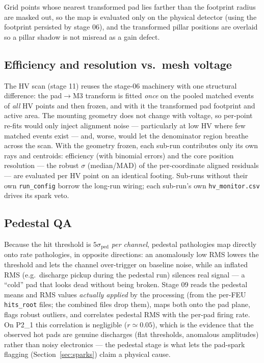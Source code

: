 \documentclass[11pt,a4paper]{article}
\newcommand{\detone}{P2\_1}
\newcommand{\code}[1]{\texttt{#1}}
\begin{document}
Grid points whose nearest transformed pad lies farther than the footprint
radius are masked out, so the map is evaluated only on the physical detector
(using the footprint persisted by stage 06), and the transformed pillar
positions are overlaid so a pillar shadow is not misread as a gain defect.

\subsection{Efficiency and resolution vs.\ mesh voltage}
\label{sec:hvscan}

The HV scan (stage 11) reuses the stage-06 machinery with one structural
difference: the pad$\to$M3 transform is fitted \emph{once} on the pooled
matched events of \emph{all} HV points and then frozen, and with it the
transformed pad footprint and active area. The mounting geometry does not
change with voltage, so per-point re-fits would only inject alignment noise
--- particularly at low HV where few matched events exist --- and, worse,
would let the denominator region breathe across the scan. With the geometry
frozen, each sub-run contributes only its own rays and centroids:
efficiency (with binomial errors) and the core position resolution --- the
robust $\sigma$ (median/MAD) of the per-coordinate aligned residuals ---
are evaluated per HV point on an identical footing. Sub-runs without their
own \code{run\_config} borrow the long-run wiring; each sub-run's own
\code{hv\_monitor.csv} drives its spark veto.

\subsection{Pedestal QA}
\label{sec:pedestal}

Because the hit threshold is $5\sigma_\text{ped}$ \emph{per channel},
pedestal pathologies map directly onto rate pathologies, in opposite
directions: an anomalously low RMS lowers the threshold and lets the channel
over-trigger on baseline noise, while an inflated RMS (e.g.\ discharge
pickup during the pedestal run) silences real signal --- a ``cold'' pad that
looks dead without being broken. Stage 09 reads the pedestal means and RMS
values \emph{actually applied} by the processing (from the per-FEU
\code{hits\_root} files; the combined files drop them), maps both onto the
pad plane, flags robust outliers, and correlates pedestal RMS with the
per-pad firing rate. On \detone{} this correlation is negligible
($r \simeq 0.05$), which is the evidence that the observed hot pads are
genuine discharges (flat thresholds, anomalous amplitudes) rather than noisy
electronics --- the pedestal stage is what lets the pad-spark flagging
(Section~\ref{sec:sparks}) claim a physical cause.
\end{document}
